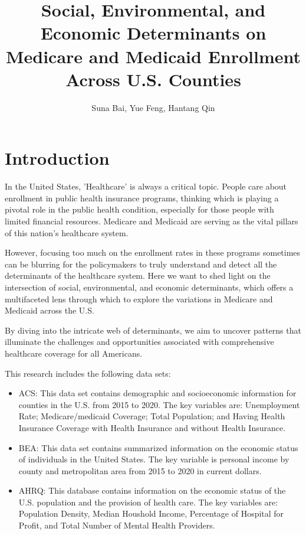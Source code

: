 \documentclass{article}
\title{Social, Environmental, and Economic Determinants on Medicare and Medicaid Enrollment Across U.S. Counties}
\author{Suna Bai, Yue Feng, Hantang Qin}
\begin{document}
\maketitle

\section{Introduction}
In the United States, 'Healthcare' is always a critical topic. People care about enrollment in public health insurance programs, thinking which is playing a pivotal role in the public health condition, especially for those people with limited financial resources. Medicare and Medicaid are serving as the vital pillars of this nation's healthcare system. 

However, focusing too much on the enrollment rates in these programs sometimes can be blurring for the policymakers to truly understand and detect all the determinants of the healthcare system. Here we want to shed light on the intersection of social, environmental, and economic determinants, which offers a multifaceted lens through which to explore the variations in Medicare and Medicaid across the U.S. 

By diving into the intricate web of determinants, we aim to uncover patterns that illuminate the challenges and opportunities associated with comprehensive healthcare coverage for all Americans. 

This research includes the following data sets:
\begin{itemize}
    \item {ACS: This data set contains demographic and socioeconomic information for counties in the U.S. from 2015 to 2020. The key variables are: Unemployment Rate; Medicare/medicaid Coverage; Total Population; and Having Health Insurance Coverage with Health Insurance and without Health Insurance. }
    \item {BEA: This data set contains summarized information on the economic status of individuals in the United States. The key variable is personal income by county and metropolitan area from 2015 to 2020 in current dollars.}
    \item {AHRQ: This database contains information on the economic status of the U.S. population and the provision of health care. The key variables are: Population Density, Median Houshold Income, Percentage of Hospital for Profit, and Total Number of Mental Health Providers.}
\end{itemize}
\end{document}
